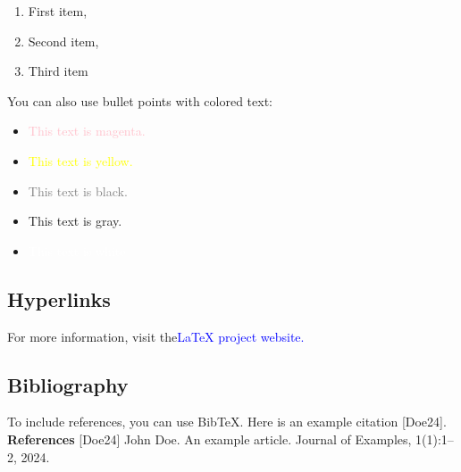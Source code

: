 \documentclass{article}
\begin{document}
\begin{enumerate}
	\item First item,
	\item Second item,
	\item Third item
\end{enumerate}
You can also use bullet points with colored text:
\begin{itemize}
	
	\item \textcolor{pink}{This text is magenta.}
	\item \textcolor{yellow}{This text is yellow.}
	\item \textcolor{gray}{This text is black.}
	\item This text is gray.
	\item \textcolor{white}{This text is white}
\end{itemize}
\subsection{Hyperlinks}
For more information, visit the\textcolor{blue}{LaTeX project website.}
\subsection{Bibliography}
To include references, you can use BibTeX. Here is an example citation [Doe24].
\\
\textbf{References}
[Doe24] John Doe. An example article. Journal of Examples, 1(1):1–2, 2024.

	
	

	
	
\end{document}
